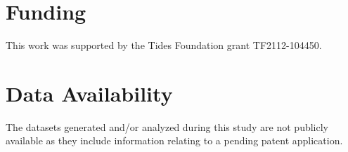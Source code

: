\documentclass[11pt,]{article}
\begin{document}
\hypertarget{funding}{%
\section{Funding}\label{funding}}

This work was supported by the Tides Foundation grant TF2112-104450.

\hypertarget{data-availability}{%
\section{Data Availability}\label{data-availability}}

The datasets generated and/or analyzed during this study are not
publicly available as they include information relating to a pending
patent application.





\newpage
\singlespacing 

\end{document}
